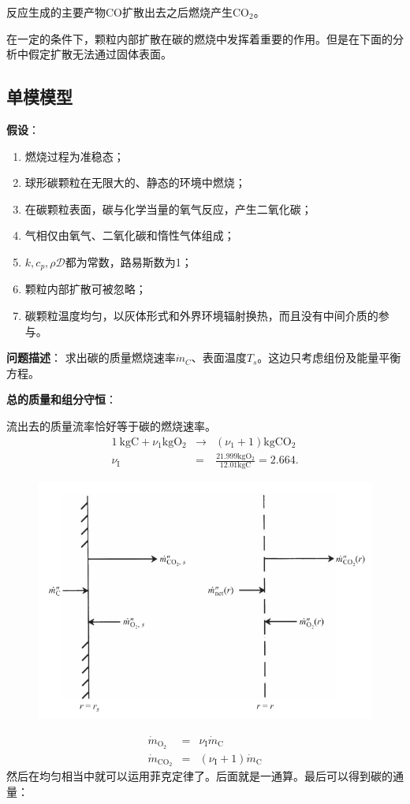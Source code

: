 反应生成的主要产物CO扩散出去之后燃烧产生\(\mathrm{CO_2}\)。

在一定的条件下，颗粒内部扩散在碳的燃烧中发挥着重要的作用。但是在下面的分析中假定扩散无法通过固体表面。

\subsection{单模模型}
\textbf{假设}：
\begin{enumerate}
    \item 燃烧过程为准稳态；
    \item 球形碳颗粒在无限大的、静态的环境中燃烧；
    \item 在碳颗粒表面，碳与化学当量的氧气反应，产生二氧化碳；
    \item 气相仅由氧气、二氧化碳和惰性气体组成；
    \item \(k,c_p,\rho\mathcal{D}\)都为常数，路易斯数为1；
    \item 颗粒内部扩散可被忽略；
    \item 碳颗粒温度均匀，以灰体形式和外界环境辐射换热，而且没有中间介质的参与。
\end{enumerate}

\textbf{问题描述}：
求出碳的质量燃烧速率\(\dot{m}_C\)、表面温度\(T_s\)。这边只考虑组份及能量平衡方程。

\textbf{总的质量和组分守恒}：

流出去的质量流率恰好等于碳的燃烧速率。
\begin{eqnarray}
    \mathrm{1~kgC} + \nu_1 \mathrm{kg O_2}&\rightarrow& (\nu_1+1)\mathrm{kgCO_2}\\
    \nu_\mathrm{I} &=& \frac{21.999\mathrm{kgO_2}}{12.01\mathrm{kg}\mathrm{C}} = 2.664.
\end{eqnarray}
\begin{multicols}{2}
    \tiny
    \begin{figure}[H]
        \centering
        \includegraphics[width=.15\textwidth]{img/mass_flux_carbon.png}
    \end{figure}
    \begin{eqnarray}
        \dot{m}_\mathrm{O_2} &=& \nu_\mathrm{I} \dot{m}_\mathrm{C}\\
        \dot{m}_\mathrm{CO_2} &=& (\nu_\mathrm{I} + 1) \dot{m}_\mathrm{C}
    \end{eqnarray}
    然后在均匀相当中就可以运用菲克定律了。后面就是一通算。最后可以得到碳的通量：
\end{multicols}

